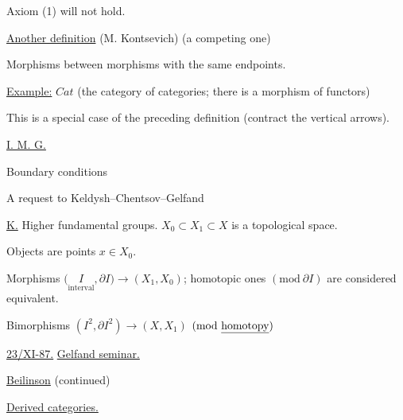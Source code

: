 
Axiom (1) will not hold.

\underline{Another definition} (M. Kontsevich) (a competing one)

Morphisms between morphisms with the same endpoints.

\underline{Example:} $Cat$ (the category of categories; there is a morphism
of functors)

This is a special case of the preceding definition (contract the vertical arrows).

\underline{I. M. G.}



Boundary conditions

A request to Keldysh--Chentsov--Gelfand

\underline{K.} Higher fundamental groups.
$X_0\subset X_1\subset X$ is a topological space.

Objects are points $x\in X_0$.

Morphisms
$\bigl(\underset{\text{interval}}{I},\partial I\bigr)\longrightarrow(X_1,X_0)$;
homotopic ones $(\mathrm{mod}\ \partial I)$ are considered equivalent.

Bimorphisms
$(I^2,\partial I^2)\longrightarrow(X,X_1)$
\qquad $(\mathrm{mod}\ \text{\underline{homotopy}})$


\underline{\underline{23/XI-87.}} \qquad \underline{Gelfand seminar.}

\underline{Beilinson} (continued)

\underline{Derived categories.}

